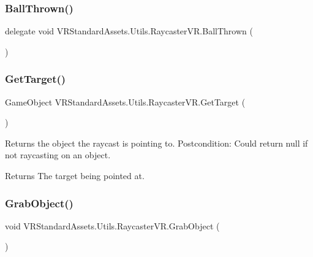 \subsubsection{\texorpdfstring{Ball\+Thrown()}{BallThrown()}}
{\footnotesize\ttfamily delegate void V\+R\+Standard\+Assets.\+Utils.\+Raycaster\+V\+R.\+Ball\+Thrown (\begin{DoxyParamCaption}{ }\end{DoxyParamCaption})}

\mbox{\label{class_v_r_standard_assets_1_1_utils_1_1_raycaster_v_r_a5e7507b5485b5da01059538a932cafb2}} 
\subsubsection{\texorpdfstring{Get\+Target()}{GetTarget()}}
{\footnotesize\ttfamily Game\+Object V\+R\+Standard\+Assets.\+Utils.\+Raycaster\+V\+R.\+Get\+Target (\begin{DoxyParamCaption}{ }\end{DoxyParamCaption})}



Returns the object the raycast is pointing to. Postcondition\+: Could return null if not raycasting on an object. 

\begin{DoxyReturn}{Returns}
The target being pointed at.
\end{DoxyReturn}
\mbox{\label{class_v_r_standard_assets_1_1_utils_1_1_raycaster_v_r_a9a87f20c50af01181912243fa8b88b21}} 
\subsubsection{\texorpdfstring{Grab\+Object()}{GrabObject()}}
{\footnotesize\ttfamily void V\+R\+Standard\+Assets.\+Utils.\+Raycaster\+V\+R.\+Grab\+Object (\begin{DoxyParamCaption}{ }\end{DoxyParamCaption})}



